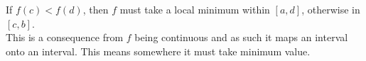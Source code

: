 \documentclass[17pt]{extarticle}
\begin{document}
If $f(c)<f(d)$, then $f$ must take a local minimum within $[a,d]$,
otherwise in $[c,b]$.\\
This is a consequence from $f$ being continuous and as such it maps an interval onto an interval. This means somewhere it must take minimum value.
\end{document}
